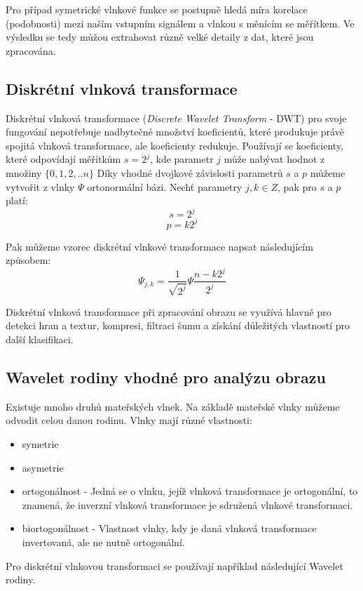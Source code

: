 Pro případ symetrické vlnkové funkce se postupně hledá míra korelace (podobnosti) mezi naším vstupním signálem a vlnkou s měnícím se měřítkem. Ve výsledku se tedy můžou extrahovat různě velké detaily z dat, které jsou zpracována. \cite{WaveletElektrorevue}

\subsection{Diskrétní vlnková transformace}
Diskrétní vlnková transformace (\textit{Discrete Wavelet Transform} - DWT) pro svoje fungování nepotřebuje nadbytečné množství koeficientů, které produkuje právě spojitá vlnková transformace, ale koeficienty redukuje. Používají se koeficienty, které odpovídají měřítkům $s = 2^j$, kde parametr $j$ může nabývat hodnot z množiny $\{0,1,2,..n\}$ Díky vhodné dvojkové závislosti parametrů $s$ a $p$ můžeme vytvořit z vlnky $\Psi$ ortonormální bázi. Nechť parametry $j, k \in Z$, pak pro $s$ a $p$ platí:
$$s = 2^j$$
$$p = k2^j$$

\noindent
Pak můžeme vzorec diskrétní vlnkové transformace napsat následujícím způsobem:
$$\Psi_{j,k} = \frac{1}{\sqrt{2^j}}\Psi\frac{n-k2^j}{2^j}$$

Diskrétní vlnková transformace při zpracování obrazu se využívá hlavně pro detekci hran a textur, kompresi, filtraci šumu a získání důležitých vlastností pro další klasifikaci. \cite{WaveletElektrorevue}

\subsection{Wavelet rodiny vhodné pro analýzu obrazu}
Existuje mnoho druhů mateřských vlnek. Na základě mateřské vlnky můžeme odvodit celou danou rodinu. Vlnky mají různé vlastnosti: \cite{PyWaveletsBrowser}
\begin{itemize}
    \item symetrie
    \item asymetrie
    \item ortogonálnost - Jedná se o vlnku, jejíž vlnková transformace je ortogonální, to znamená, že inverzní vlnková transformace je sdružená vlnkové transformaci. \cite{WaveletBasics} 
    \item biortogonálnost - Vlastnost vlnky, kdy je daná vlnková transformace invertovaná, ale ne nutně ortogonální. 
\end{itemize}
\noindent
Pro diskrétní vlnkovou transformaci se používají například následující Wavelet rodiny.

